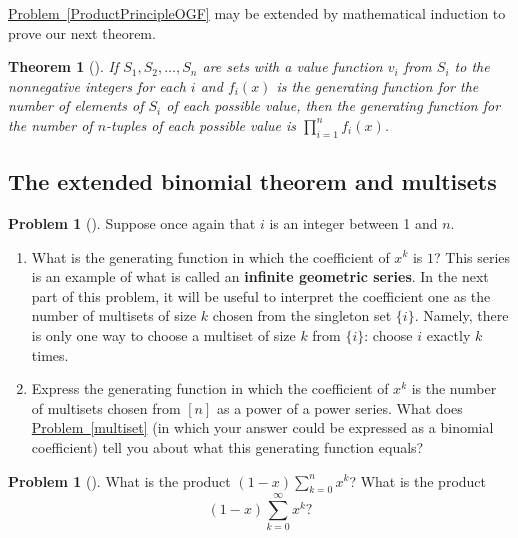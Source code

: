 \documentclass[10pt,]{book}
\newcommand{\terminology}[1]{\textbf{#1}}
\theoremstyle{plain}
\newtheorem{theorem}{Theorem}[section]
\theoremstyle{definition}
\newtheorem{activity}[project]{Problem}
\theoremstyle{definition}
\numberwithin{equation}{chapter}
\begin{document}
\hyperref[ProductPrincipleOGF]{Problem~\ref{ProductPrincipleOGF}} may be extended by mathematical induction to prove our next theorem.%
\begin{theorem}[{}]\label{theorem-7}
If \(S_1,S_2,\dots,S_n\) are sets with a value function \(v_i\) from \(S_i\) to the nonnegative integers for each \(i\) and \(f_i(x)\) is the generating function for the number of elements of \(S_i\) of each possible value, then the generating function for the number of \(n\)-tuples of each possible value is \(\prod_{i=1}^n f_i(x)\).%
\end{theorem}
\typeout{************************************************}
\typeout{************************************************}
\subsection[{The extended binomial theorem and multisets}]{The extended binomial theorem and multisets}\label{subsection-45}
\begin{activity}[] \label{activity-192}
Suppose once again that \(i\) is an integer between 1 and \(n\).%
\begin{enumerate}[font=\bfseries,label=(\alph*),ref=\alph*]
\item\label{task-131} \marginsymbol[-2.5em]{} What is the generating function in which the coefficient of \(x^k\) is \(1\)? This series is an example of what is called an \terminology{infinite geometric series}. In the next part of this problem, it will be useful to interpret the coefficient one as the number of multisets of size \(k\) chosen from the singleton set \(\{i\}\). Namely, there is only one way to choose a multiset of size \(k\) from \(\{i\}\): choose \(i\) exactly \(k\) times.%
\item\label{task-132} \marginsymbol[-2.5em]{} Express the generating function in which the coefficient of \(x^k\) is the number of multisets chosen from \([n]\) as a power of a power series.  What does \hyperref[multiset]{Problem~\ref{multiset}} (in which your answer could be expressed as a binomial coefficient) tell you about what this generating function equals?%
\end{enumerate}
\end{activity}
\begin{activity}[] \label{activity-193}
What is the product \((1-x)\sum_{k=0}^n x^k\)? What is the product%
\begin{equation*}
(1-x)\sum_{k=0}^\infty x^k?
\end{equation*}
%
\end{activity}
\end{document}
